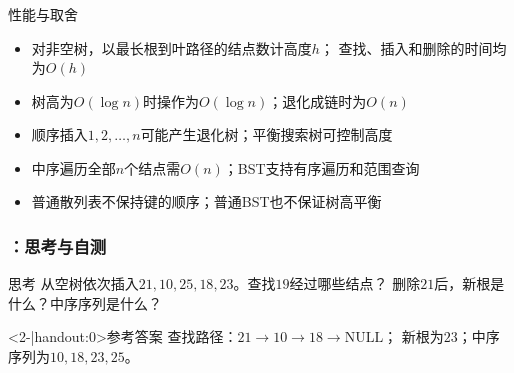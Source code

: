 \begin{frame}
    \frametitle{\insertsectionhead}
    \begin{block}{性能与取舍}
        \begin{itemize}
            \item 对非空树，以最长根到叶路径的结点数计高度$h$；
                  查找、插入和删除的时间均为$O(h)$
            \item 树高为$O(\log n)$时操作为$O(\log n)$；退化成链时为$O(n)$
            \item 顺序插入$1,2,\ldots,n$可能产生退化树；平衡搜索树可控制高度
            \item 中序遍历全部$n$个结点需$O(n)$；BST支持有序遍历和范围查询
            \item 普通散列表不保持键的顺序；普通BST也不保证树高平衡
        \end{itemize}
    \end{block}
\end{frame}



\begin{frame}
    \frametitle{\insertsectionhead：思考与自测}
    \begin{alertblock}{思考}
        从空树依次插入$21,10,25,18,23$。查找$19$经过哪些结点？
        删除$21$后，新根是什么？中序序列是什么？
    \end{alertblock}
    \begin{block}<2-|handout:0>{参考答案}
        查找路径：$21\rightarrow10\rightarrow18\rightarrow\mathrm{NULL}$；
        新根为$23$；中序序列为$10,18,23,25$。
    \end{block}
\end{frame}

